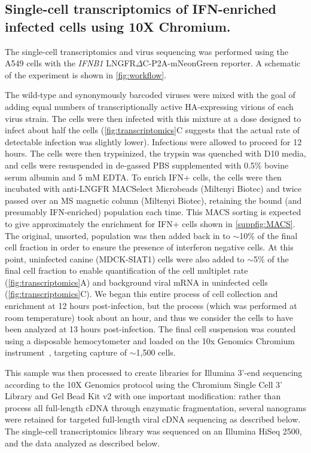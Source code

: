 \documentclass[]{asm-article}
\newcommand{\FIG}[1]{\autoref{fig:#1}}
\newcommand{\SUPPFIG}[1]{\autoref{suppfig:#1}}
\begin{document}
\subsection{Single-cell transcriptomics of IFN-enriched infected cells using 10X Chromium.}
The single-cell transcriptomics and virus sequencing was performed using the A549 cells with the \textit{IFNB1} LNGFR$\Delta$C-P2A-mNeonGreen reporter.
A schematic of the experiment is shown in \FIG{workflow}.

The wild-type and synonymously barcoded viruses were mixed with the goal of adding equal numbers of transcriptionally active HA-expressing virions of each virus strain.
The cells were then infected with this mixture at a dose designed to infect about half the cells (\FIG{transcriptomics}C suggests that the actual rate of detectable infection was slightly lower).
Infections were allowed to proceed for 12 hours.
The cells were then trypsinized, the trypsin was quenched with D10 media, and cells were resuspended in de-gassed PBS supplemented with 0.5\% bovine serum albumin and 5 mM EDTA. 
To enrich IFN+ cells, the cells were then incubated with anti-LNGFR MACSelect Microbeads (Miltenyi Biotec) and twice passed over an MS magnetic column (Miltenyi Biotec), retaining the bound (and presumably IFN-enriched) population each time. 
This MACS sorting is expected to give approximately the enrichment for IFN+ cells shown in \SUPPFIG{MACS}.
The original, unsorted, population was then added back in to $\sim$10\% of the final cell fraction in order to ensure the presence of interferon negative cells. 
At this point, uninfected canine (MDCK-SIAT1) cells were also added to $\sim$5\% of the final cell fraction to enable quantification of the cell multiplet rate (\FIG{transcriptomics}A) and background viral mRNA in uninfected cells (\FIG{transcriptomics}C). 
We began this entire process of cell collection and enrichment at 12 hours post-infection, but the process (which was performed at room temperature) took about an hour, and thus we consider the cells to have been analyzed at 13 hours post-infection.
The final cell suspension was counted using a disposable hemocytometer and loaded on the 10x Genomics Chromium instrument~\cite{zheng2017massively}, targeting capture of $\sim$1,500 cells. 

This sample was then processed to create libraries for Illumina 3'-end sequencing according to the 10X Genomics protocol using the Chromium Single Cell 3' Library and Gel Bead Kit v2 with one important modification: rather than process all full-length cDNA through enzymatic fragmentation, several nanograms were retained for targeted full-length viral cDNA sequencing as described below.
The single-cell transcriptomics library was sequenced on an Illumina HiSeq 2500, and the data analyzed as described below.
\end{document}

